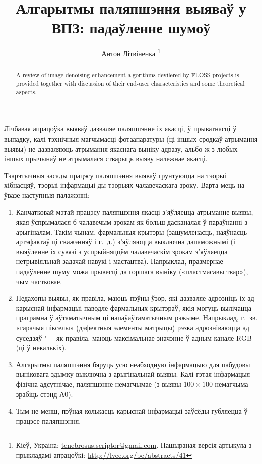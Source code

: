 \documentclass[10pt, a5paper]{article}
\begin{document}
\title{Алгарытмы паляпшэння выяваў у ВПЗ: падаўленне шумоў}
\author{Антон Літвіненка \footnote{Кіеў, Украіна; \url{tenebrosus.scriptor@gmail.com}. Пашыраная версія артыкула з прыкладамі апрацоўкі: \url{http://lvee.org/be/abstracts/41}}}
\maketitle
\begin{abstract}
A review of image denoising enhancement algorithms devilered by FLOSS projects is provided together with discussion of their end-user characteristics and some theoretical aspects.
\end{abstract}
Лічбавая апрацоўка выяваў дазваляе паляпшэнне іх якасці, ў прыватнасці ў выпадку, калі тэхнічныя магчымасці фотаапаратуры (ці іншых сродкаў атрымання выявы) не дазваляюць атрымання якаснага выніку адразу, альбо ж з любых іншых прычынаў не атрымалася стварыць выяву належнае якасці.

Тэарэтычныя засады працэсу паляпшэння выяваў грунтуюцца на тэорыі хібнасцяў, тэорыі інфармацыі ды тэорыях чалавечаскага зроку. Варта мець на ўвазе наступныя палажэнні:

\begin{enumerate}
  \item Канчатковай мэтай працэсу паляпшэння якасці з’яўляецца атрыманне выявы, якая ўспрымалася б чалавечым зрокам як больш дасканалая ў параўнанні з арыгіналам. Такім чынам, фармальныя крытэры (зашумленасць, наяўнасць артэфактаў ці скажэнняў і г.~д.) з’яўляюцца выключна дапаможнымі (і выяўленне іх сувязі з успрыйняццём чалавечаскім зрокам з’яўляецца нетрывіяльнай задачай навукі і мастацтва). Напрыклад, празмернае падаўленне шуму можа прывесці да горшага выніку  («пластмасавы твар»), чым частковае.
  \item Недахопы выявы, як правіла, маюць пэўны ўзор, які дазваляе адрозніць іх ад карыснай інфармацыі паводле фармальных крытэраў, якія могуць вылічацца праграмна ў аўтаматычным ці напаўаўтаматычным рэжыме. Напрыклад, г.~зв. «гарачыя пікселы» (дэфектныя элементы матрыцы) рэзка адрозніваюцца ад суседзяў "--- як правіла, маюць максімальнае значэнне ў адным канале RGB (ці ў некалькіх).
  \item Алгарытмы паляпшэння бяруць усю неабходную інфармацыю для пабудовы выніковага здымку выключна з арыгінальнай выявы. Калі гэтая інфармацыя фізічна адсутнічае, паляпшэнне немагчымае (з выявы $100\times100$ немагчыма зрабіць стэнд А0).
  \item Тым не менш, пэўная колькасць карыснай інфармацыі заўсёды губляецца ў працэсе паляпшэння.
\end{enumerate}
\end{document}
